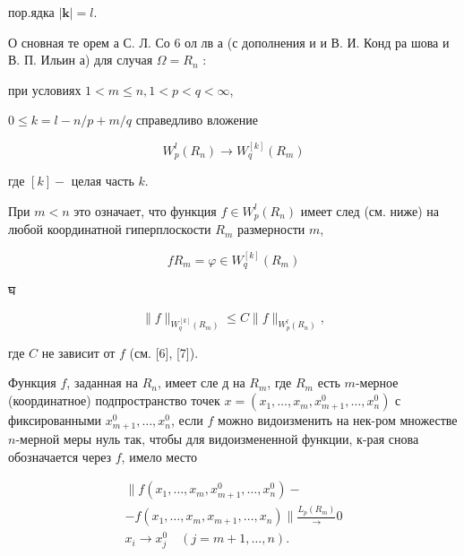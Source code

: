 \documentclass[10pt]{article}
\begin{document}
пор.ядка $|\boldsymbol{k}|=l$.



О сновная те орем а С. Л. Со 6 ол лв а (с дополнения и и В. И. Конд ра шова и В. П. Ильин а) для случая $\Omega=R_{n}$ :



при условиях $1<m \leqslant n, 1<p<q<\infty$,



$0 \leqslant k=l-n / p+m / q$ справедливо вложение



\[

W_{p}^{l}\left(R_{n}\right) \longrightarrow W_{q}^{[k]}\left(R_{m}\right)

\]



где $[k]-$ целая часть $k$.



При $m<n$ это означает, что функция $f \in W_{p}^{l}\left(R_{n}\right)$ имеет след (см. ниже) на любой координатной гиперплоскости $R_{m}$ размерности $m$,



\[

f R_{m}=\varphi \in W_{q}^{[k]}\left(R_{m}\right)

\]



घ



\[

\|f\|_{W_{q}^{[k]}\left(R_{m}\right)} \leqslant C\|f\|_{W_{p}^{l}\left(R_{n}\right)},

\]



где $C$ не зависит от $f$ (см. [6], [7]).



Функция $f$, заданная на $R_{n}$, имеет сле д на $R_{m}$, где $R_{m}$ есть $m$-мерное (координатное) подпространство точек $x=\left(x_{1}, \ldots, x_{m}, x_{m+1}^{0}, \ldots, x_{n}^{0}\right)$ с фиксированными $x_{m+1}^{0}, \ldots, x_{n}^{0}$, если $f$ можно видоизменить на нек-ром множестве $n$-мерной меры нуль так, чтобы для видоизмененной функции, к-рая снова обозначается через $f$, имело место



\[

\begin{gathered}

\| f\left(x_{1}, \ldots, x_{m}, x_{m+1}^{0}, \ldots, x_{n}^{0}\right)- \\

-f\left(x_{1}, \ldots, x_{m}, x_{m+1}, \ldots, x_{n}\right) \| \frac{L_{p}\left(R_{m}\right)}{\longrightarrow} 0 \\

x_{i} \longrightarrow x_{j}^{0} \quad(j=m+1, \ldots, n) .

\end{gathered}

\]
\end{document}

